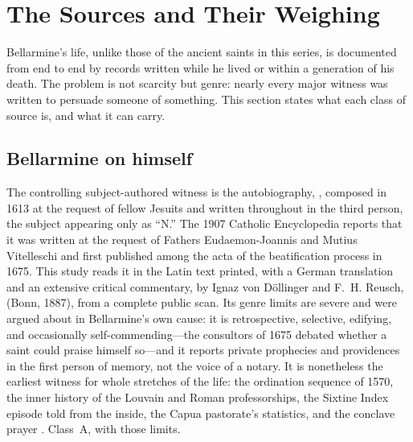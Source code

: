 \section{The Sources and Their Weighing}

Bellarmine's life, unlike those of the ancient saints in this series,
is documented from end to end by records written while he lived or
within a generation of his death. The problem is not scarcity but
genre: nearly every major witness was written to persuade someone of
something. This section states what each class of source is, and what
it can carry.

\subsection{Bellarmine on himself}

The controlling subject-authored witness is the autobiography,
,
composed in 1613 at the request of fellow Jesuits and written
throughout in the third person, the subject appearing only as ``N.''
The 1907 Catholic Encyclopedia reports that it was written at the
request of Fathers Eudaemon-Joannis and Mutius Vitelleschi and first
published among the acta of the beatification process in 1675. This
study reads it in the Latin text printed, with a German translation
and an extensive critical commentary, by Ignaz von D\"ollinger and
F.~H. Reusch, 
(Bonn, 1887), from a complete public scan. Its genre limits are
severe and were argued about in Bellarmine's own cause: it is
retrospective, selective, edifying, and occasionally
self-commending---the consultors of 1675 debated whether a saint
could praise himself so---and it reports private prophecies and
providences in the first person of memory, not the voice of a
notary. It is nonetheless the earliest witness for whole stretches
of the life: the ordination sequence of 1570, the inner history of
the Louvain and Roman professorships, the Sixtine Index episode told
from the inside, the Capua pastorate's statistics, and the conclave
prayer . Class~A, with those limits.

